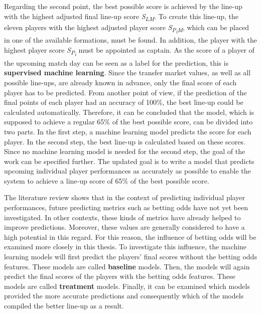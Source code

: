 Regarding the second point, the best possible score is achieved by the line-up with the highest adjusted final line-up score \emph{S\textsubscript{LM}}. To create this line-up, the eleven players with the highest adjusted player score \emph{S\textsubscript{P\textsubscript{i}M}}, which can be placed in one of the available formations, must be found. In addition, the player with the highest player score \emph{S\textsubscript{P\textsubscript{i}}} must be appointed as captain. As the score of a player of the upcoming match day can be seen as a label for the prediction, this is \textbf{supervised machine learning}. Since the transfer market values, as well as all possible line-ups, are already known in advance, only the final score of each player has to be predicted. From another point of view, if the prediction of the final points of each player had an accuracy of 100\%, the best line-up could be calculated automatically. Therefore, it can be concluded that the model, which is supposed to achieve a regular 65\% of the best possible score, can be divided into two parts. In the first step, a machine learning model predicts the score for each player. In the second step, the best line-up is calculated based on these scores. Since no machine learning model is needed for the second step, the goal of the work can be specified further. The updated goal is to write a model that predicts upcoming individual player performances as accurately as possible to enable the system to achieve a line-up score of 65\% of the best possible score.

The literature review shows that in the context of predicting individual player performances, future predicting metrics such as betting odds have not yet been investigated. In other contexts, these kinds of metrics have already helped to improve predictions. \parencite[cf.][]{landers_machine_2017} Moreover, these values are generally considered to have a high potential in this regard. \parencite[cf.][]{wheatcroft_profiting_2020,goldstein_wisdom_2014} For this reason, the influence of betting odds will be examined more closely in this thesis. To investigate this influence, the machine learning models will first predict the players' final scores without the betting odds features. These models are called \textbf{baseline} models. Then, the models will again predict the final scores of the players with the betting odds features. These models are called \textbf{treatment} models. Finally, it can be examined which models provided the more accurate predictions and consequently which of the models compiled the better line-up as a result.

